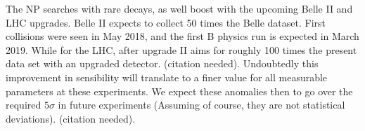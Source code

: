 The NP searches with rare decays, as well boost with the upcoming Belle II and LHC upgrades. Belle II expects to collect 50 times the Belle dataset. First collisions were seen in May 2018, and the first B physics run is expected in March 2019. While for the LHC, after upgrade II aims for roughly 100 times the present data set with an upgraded detector. {\color{blue} (citation needed)}.
%
%
Undoubtedly this improvement in sensibility will translate to a finer value for all measurable parameters at these experiments. We expect these anomalies then to go over the required $5 \sigma$ in future experiments (Assuming of course, they are not statistical deviations). {\color{blue} (citation needed)}.

